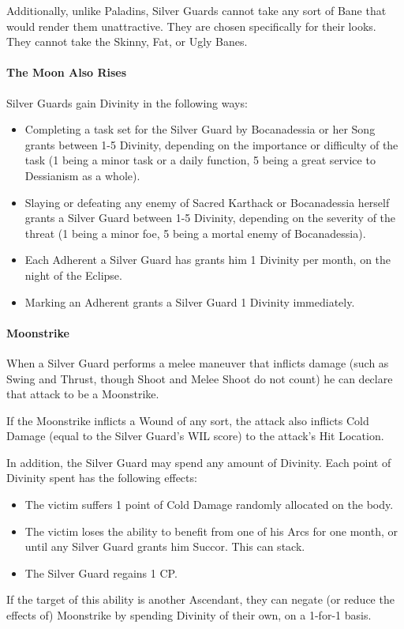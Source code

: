 \documentclass[oneside,11pt,english]{book}
\begin{document}
Additionally, unlike Paladins, Silver Guards cannot take any sort of Bane that would render them unattractive. They are chosen specifically for their looks. They cannot take the Skinny, Fat, or Ugly Banes. 
\paragraph{The Moon Also Rises}
Silver Guards gain Divinity in the following ways: 
\begin{itemize}
\item Completing a task set for the Silver Guard by Bocanadessia or her Song grants between 
1-5 Divinity, depending on the importance or difficulty of the task (1 being a minor task 
or a daily function, 5 being a great service to Dessianism as a whole). 
\item Slaying or defeating any enemy of Sacred Karthack or Bocanadessia herself grants a 
Silver Guard between 1-5 Divinity, depending on the severity of the threat (1 being a 
minor foe, 5 being a mortal enemy of Bocanadessia). 
\item Each Adherent a Silver Guard has grants him 1 Divinity per month, on the night of the 
Eclipse. 
\item Marking an Adherent grants a Silver Guard 1 Divinity immediately. 
\end{itemize}
\paragraph{Moonstrike}
When a Silver Guard performs a melee maneuver that inflicts damage (such as Swing and Thrust, 
though Shoot and Melee Shoot do not count) he can declare that attack to be a Moonstrike. 


If the Moonstrike inflicts a Wound of any sort, the attack also inflicts Cold Damage (equal to the 
Silver Guard's WIL score) to the attack’s Hit Location. 


In addition, the Silver Guard may spend any amount of Divinity. Each point of Divinity spent has 
the following effects: 
\begin{itemize}
\item The victim suffers 1 point of Cold Damage randomly allocated on the body. 
\item The victim loses the ability to benefit from one of his Arcs for one month, or until any 
Silver Guard grants him Succor. This can stack. 
\item The Silver Guard regains 1 CP. 
\end{itemize}
If the target of this ability is another Ascendant, they can negate (or reduce the effects of) Moonstrike by spending Divinity of their own, on a 1-for-1 basis. 
\end{document}
